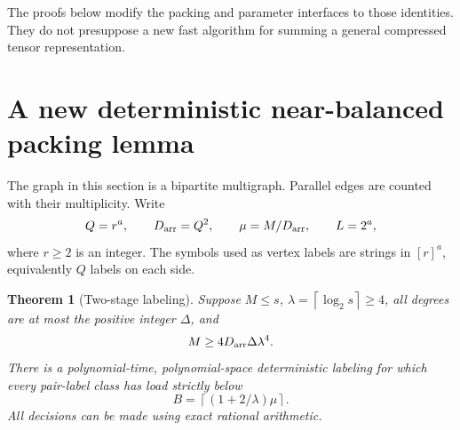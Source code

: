 \documentclass[11pt,letterpaper]{article}
\numberwithin{equation}{section}
\newtheorem{theorem}{Theorem}[section]
\theoremstyle{definition}\newtheorem{definition}[theorem]{Definition}
\theoremstyle{remark}\newtheorem{remark}[theorem]{Remark}
\newcommand{\ceil}[1]{\left\lceil #1\right\rceil}
\newcommand{\Darr}{D_{\rm arr}}
\begin{document}
The proofs below modify the packing and parameter interfaces to those
identities. They do not presuppose a new fast algorithm for summing a
general compressed tensor representation.

\section{A new deterministic near-balanced packing lemma}
\label{sec:packing}

The graph in this section is a bipartite multigraph. Parallel edges are
counted with their multiplicity. Write
\[
 Q=r^a,\qquad \Darr=Q^2,\qquad \mu=M/\Darr,
 \qquad L=2^a,
\]
where $r\ge2$ is an integer. The symbols used as vertex labels are strings
in $[r]^a$, equivalently $Q$ labels on each side.

\begin{theorem}[Two-stage labeling]\label{thm:labeling}
Suppose $M\le s$, $\lambda=\ceil{\log_2s}\ge4$, all degrees are at most
the positive integer $\Delta$, and
\begin{equation}
 M\ge4\Darr\Delta\lambda^4.\label{eq:new-packing}
\end{equation}
There is a polynomial-time, polynomial-space deterministic labeling
for which every pair-label class has load strictly below
\[
 B=\ceil{(1+2/\lambda)\mu}.
\]
All decisions can be made using exact rational arithmetic.
\end{theorem}
\end{document}
